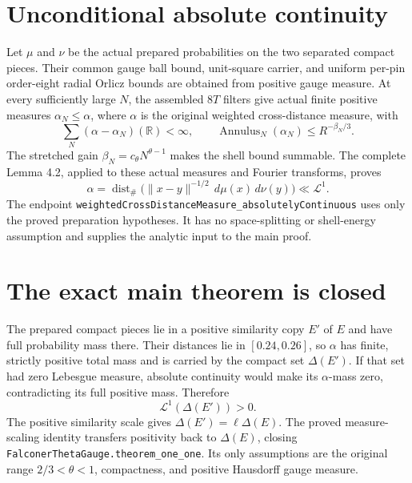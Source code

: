 \documentclass[11pt]{article}
\newcommand{\LL}{\mathcal L}
\begin{document}
\section*{Unconditional absolute continuity}
Let $\mu$ and $\nu$ be the actual prepared probabilities on the two separated
compact pieces. Their common gauge ball bound, unit-square carrier, and
uniform per-pin order-eight radial Orlicz bounds are obtained from positive
gauge measure. At every sufficiently large $N$, the assembled $8T$ filters
give actual finite positive measures $\alpha_N\le\alpha$, where $\alpha$ is
the original weighted cross-distance measure, with
\[
\sum_N(\alpha-\alpha_N)(\mathbb R)<\infty,
\qquad \operatorname{Annulus}_N(\alpha_N)\le R^{-\beta_N/3}.
\]
The stretched gain $\beta_N=c_\theta N^{\theta-1}$ makes the shell bound
summable. The complete Lemma 4.2, applied to these actual measures and Fourier
transforms, proves
\[
\alpha=\operatorname{dist}_{\#}
 \bigl(\lVert x-y\rVert^{-1/2}\,d\mu(x)\,d\nu(y)\bigr)
\ll\LL^1.
\]
The endpoint
\texttt{weightedCrossDistanceMeasure\_absolutelyContinuous}
uses only the proved preparation hypotheses. It has no space-splitting or
shell-energy assumption and supplies the analytic input to the main proof.

\newpage
\section*{The exact main theorem is closed}
The prepared compact pieces lie in a positive similarity copy $E'$ of $E$
and have full probability mass there. Their distances lie in $[0.24,0.26]$,
so $\alpha$ has finite, strictly positive total mass and is carried by the
compact set $\Delta(E')$. If that set had zero Lebesgue measure, absolute
continuity would make its $\alpha$-mass zero, contradicting its full positive
mass. Therefore
\[
\LL^1(\Delta(E'))>0.
\]
The positive similarity scale gives $\Delta(E')=\ell\Delta(E)$. The proved
measure-scaling identity transfers positivity back to $\Delta(E)$, closing
\texttt{FalconerThetaGauge.theorem\_one\_one}. Its only assumptions are the
original range $2/3<\theta<1$, compactness, and positive Hausdorff gauge
measure.
\end{document}
